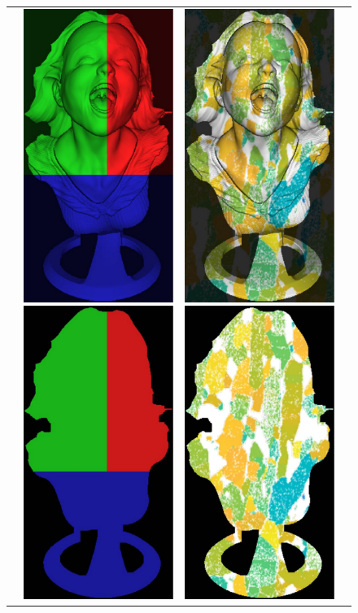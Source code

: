 \begin{figure}[H]
  \setlength{\tabcolsep}{0.5em} %
{\renewcommand{\arraystretch}{0.6}%
\begin{tabular}{cccc}
&
    \includegraphics[height=0.25\linewidth]{figures/result/comp_simple_rgb.pdf}
    \includegraphics[height=0.25\linewidth]{figures/result/comp_simple_albedo.pdf}& 
    \includegraphics[height=0.25\linewidth]{figures/result/comp_pattern_rgb.pdf} 
    \includegraphics[height=0.25\linewidth]{figures/result/comp_pattern_albedo.pdf}& 

\end{tabular}}
\end{figure}

